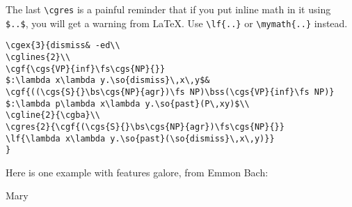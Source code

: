 \documentclass[11pt]{article}
\begin{document}
The last \verb|\cgres| is a painful reminder that if you put inline math
in it using \verb|$..$|, you will get a warning from \LaTeX. Use \verb|\lf{..}| or \verb|\mymath{..}|  instead.\medskip

\begin{verbatim}
\cgex{3}{dismiss& -ed\\
\cglines{2}\\
\cgf{\cgs{VP}{inf}\fs\cgs{NP}{}}
$:\lambda x\lambda y.\so{dismiss}\,x\,y$&
\cgf{((\cgs{S}{}\bs\cgs{NP}{agr})\fs NP)\bss(\cgs{VP}{inf}\fs NP)}
$:\lambda p\lambda x\lambda y.\so{past}(P\,xy)$\\
\cgline{2}{\cgba}\\
\cgres{2}{\cgf{(\cgs{S}{}\bs\cgs{NP}{agr})\fs\cgs{NP}{}}
\lf{\lambda x\lambda y.\so{past}(\so{dismiss}\,x\,y)}}
}
\end{verbatim}
\newpage

Here is one example with features galore, from Emmon Bach:\bigskip

{\footnotesize
Mary }\bigskip
\end{document}
